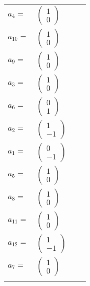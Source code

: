 \documentclass[1p]{elsarticle_modified}
\theoremstyle{definition}
\begin{document}
\begin{tabular}{m{7pt} m{180pt} m{7pt} m{180pt} }
\flushright $a_{4}=$&$\begin{pmatrix}1\\0\end{pmatrix}$ \\
\flushright $a_{10}=$&$\begin{pmatrix}1\\0\end{pmatrix}$ \\
\flushright $a_{9}=$&$\begin{pmatrix}1\\0\end{pmatrix}$ \\
\flushright $a_{3}=$&$\begin{pmatrix}1\\0\end{pmatrix}$ \\
\flushright $a_{6}=$&$\begin{pmatrix}0\\1\end{pmatrix}$ \\
\flushright $a_{2}=$&$\begin{pmatrix}1\\-1\end{pmatrix}$ \\
\flushright $a_{1}=$&$\begin{pmatrix}0\\-1\end{pmatrix}$ \\
\flushright $a_{5}=$&$\begin{pmatrix}1\\0\end{pmatrix}$ \\
\flushright $a_{8}=$&$\begin{pmatrix}1\\0\end{pmatrix}$ \\
\flushright $a_{11}=$&$\begin{pmatrix}1\\0\end{pmatrix}$ \\
\flushright $a_{12}=$&$\begin{pmatrix}1\\-1\end{pmatrix}$ \\
\flushright $a_{7}=$&$\begin{pmatrix}1\\0\end{pmatrix}$\\&\end{tabular}
\end{document}
